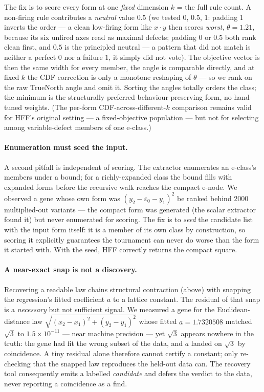 \documentclass[sigconf]{acmart}
\begin{document}
The fix is to score every form at one \emph{fixed} dimension $k$ = the full rule
count. A non-firing rule contributes a \emph{neutral} value $0.5$ (we tested
$0$, $0.5$, $1$: padding $1$ inverts the order --- a clean low-firing form like
$x\!\cdot\!y$ then scores \emph{worst}, $\theta=1.21$, because its six unfired
axes read as maximal defects; padding $0$ or $0.5$ both rank clean first, and
$0.5$ is the principled neutral --- a pattern that did not match is neither a
perfect $0$ nor a failure $1$, it simply did not vote). The objective vector is
then the same width for every member, the angle is comparable directly, and at
fixed $k$ the CDF correction is only a monotone reshaping of $\theta$ --- so we
rank on the raw TrueNorth angle and omit it. Sorting the angles totally orders
the class; the minimum is the structurally preferred behaviour-preserving form,
no hand-tuned weights. (The per-form CDF-across-different-$k$ comparison remains
valid for HFF's original setting --- a fixed-objective population --- but not for
selecting among variable-defect members of one e-class.)

\paragraph{Enumeration must seed the input.} A second pitfall is independent of
scoring. The extractor enumerates an e-class's members under a bound; for a
richly-expanded class the bound fills with expanded forms before the recursive
walk reaches the compact e-node. We observed a gene whose own form was
$(y_2-\varepsilon_0-y_1)^2$ be ranked behind 2000 multiplied-out variants ---
the compact form was generated (the scalar extractor found it) but never
enumerated for scoring. The fix is to \emph{seed} the candidate list with the
input form itself: it is a member of its own class by construction, so scoring it
explicitly guarantees the tournament can never do worse than the form it started
with. With the seed, HFF correctly returns the compact square.

\paragraph{A near-exact snap is not a discovery.} Recovering a readable law
chains structural contraction (above) with snapping the regression's fitted
coefficient $a$ to a lattice constant. The residual of that snap is a
\emph{necessary} but not sufficient signal. We measured a gene for the
Euclidean-distance law $\sqrt{(x_2-x_1)^2+(y_2-y_1)^2}$ whose fitted $a=1.7320508$
matched $\sqrt3$ to $1.5\times10^{-11}$ --- near machine precision --- yet $\sqrt3$
appears nowhere in the truth: the gene had fit the wrong subset of the data, and
$a$ landed on $\sqrt3$ by coincidence. A tiny residual alone therefore cannot
certify a constant; only re-checking that the snapped law reproduces the held-out
data can. The recovery tool consequently emits a labelled \emph{candidate} and
defers the verdict to the data, never reporting a coincidence as a find.
\end{document}

